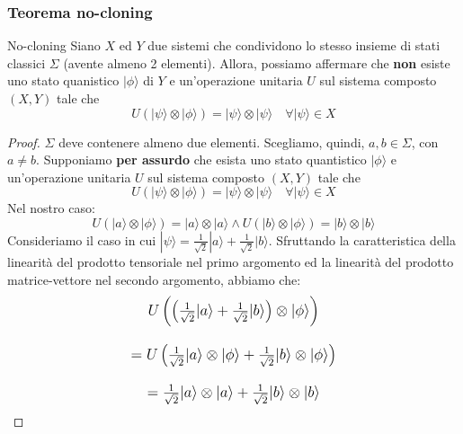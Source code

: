 \subsubsection{Teorema no-cloning}
\begin{theorem}{No-cloning}{}
    Siano $X$ ed $Y$ due sistemi che condividono lo stesso insieme di stati classici $\Sigma$
    (avente almeno 2 elementi). Allora, possiamo affermare che \textbf{non} esiste uno stato 
    quanistico $|\phi\rangle$ di $Y$ e un'operazione unitaria $U$ sul sistema composto $(X,Y)$
    tale che
    \begin{equation*}
        U(|\psi\rangle \otimes |\phi\rangle) = |\psi\rangle \otimes |\psi\rangle \quad \forall |\psi\rangle \in X
    \end{equation*}    
\end{theorem}
\begin{proof}
    $\Sigma$ deve contenere almeno due elementi. Scegliamo, quindi, $a,b \in \Sigma$, con $a \not = b$.
    Supponiamo \textbf{per assurdo} che esista uno stato quantistico $|\phi\rangle$ e un'operazione unitaria $U$ sul sistema composto $(X,Y)$
    tale che
    \begin{equation*}
        U(|\psi\rangle \otimes |\phi\rangle) = |\psi\rangle \otimes |\psi\rangle \quad \forall |\psi\rangle \in X
    \end{equation*}
    Nel nostro caso:
    \begin{equation*}
        U(|a\rangle \otimes |\phi\rangle) = |a\rangle \otimes |a\rangle \wedge U(|b\rangle \otimes |\phi\rangle) = |b\rangle \otimes |b\rangle
    \end{equation*}
    Consideriamo il caso in cui $|\psi\rangle = \frac{1}{\sqrt{2}}|a\rangle + \frac{1}{\sqrt{2}}|b\rangle$.
    Sfruttando la caratteristica della linearità del prodotto tensoriale nel primo argomento ed
    la linearità del prodotto matrice-vettore nel secondo argomento, abbiamo che:
    \begin{equation*}
        \large
        \begin{array}{c}
            U\left(\left(\frac{1}{\sqrt{2}}|a\rangle + \frac{1}{\sqrt{2}}|b\rangle\right) \otimes |\phi\rangle \right) \\ \\
            = U\left(\frac{1}{\sqrt{2}}|a\rangle \otimes |\phi\rangle + \frac{1}{\sqrt{2}}|b\rangle \otimes |\phi\rangle\right) \\ \\
            = \frac{1}{\sqrt{2}}|a\rangle \otimes |a\rangle + \frac{1}{\sqrt{2}}|b\rangle \otimes |b\rangle

\end{array}
\end{equation*}
\end{proof}
